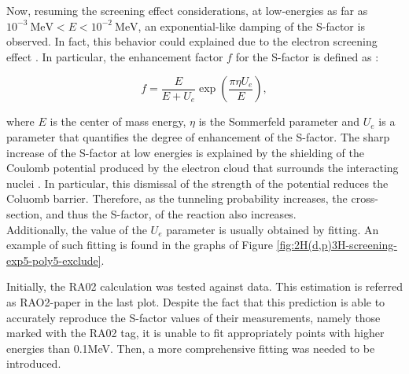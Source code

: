 \documentclass[openany]{book}
\begin{document}
Now, resuming the screening effect considerations, at low-energies as far as $ \mathrm{10^{-3} \ MeV}  <  E<\mathrm{10^{-2} \ MeV}$, an exponential-like damping of the S-factor is observed. In fact, this  behavior could explained due to the electron screening effect \cite{raiola_migliardi_gyurky_aliotta_formicola_bonetti_broggini_campajola_corvisiero_costantini_et_2002}. In particular, the enhancement factor $f$ for the S-factor is defined as \cite{assenbaum_langanke_rolfs_1987}: 

\begin{equation}\label{eq:screening_factor}
	f = \frac{E}{E + U_e}\exp{\left(\frac{\pi \eta U_e}{E}\right)},
\end{equation}

where $E$ is the center of mass energy, $\eta$ is the Sommerfeld parameter and $U_e$ is a parameter that quantifies the degree of enhancement of the S-factor. The sharp increase of the S-factor at low energies is explained by the shielding of the Coulomb potential produced by the electron cloud that surrounds the interacting nuclei \cite{assenbaum_langanke_rolfs_1987}. In particular, this dismissal of the strength of the potential reduces the Coluomb barrier. Therefore, as the tunneling probability increases, the cross-section, and thus the S-factor, of the reaction also increases. \\

Additionally, the value of the $U_e$ parameter is usually obtained by fitting. An example of such fitting is found in the graphs of Figure \ref{fig:2H(d,p)3H-screening-exp5-poly5-exclude}.


Initially, the RA02 calculation \cite{raiola_migliardi_gyurky_aliotta_formicola_bonetti_broggini_campajola_corvisiero_costantini_et_2002} was tested against data. This estimation is referred as RAO2-paper in the last plot. Despite the fact that this prediction is able to accurately reproduce the S-factor values of their measurements, namely those marked with the RA02 tag, it is unable to fit appropriately points with higher energies than 0.1MeV. Then, a more comprehensive fitting was needed to be introduced. 
\end{document}
